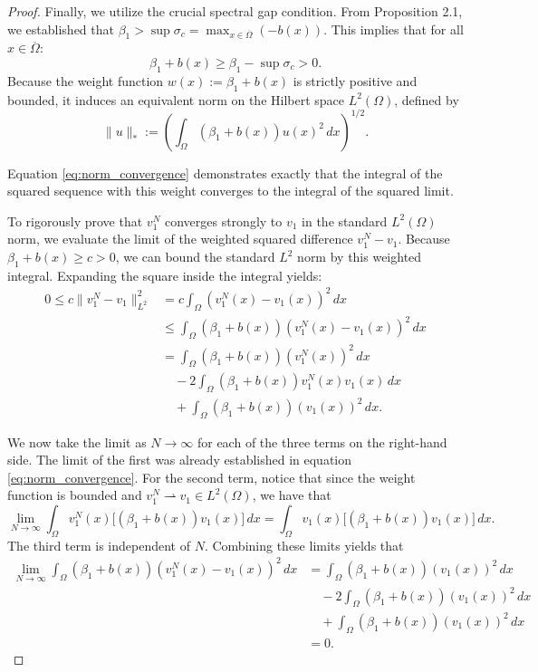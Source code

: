 \documentclass[12pt, a4paper]{article}
\theoremstyle{break}
\theoremstyle{break}
\theoremstyle{break}
\theoremstyle{break}
\theoremstyle{break}
\theoremstyle{break}
\theoremstyle{break}
\theoremstyle{break}
\theoremstyle{break}
\begin{document}
\begin{proof}
    Finally, we utilize the crucial spectral gap condition. From Proposition 2.1, we established that $\beta_1 > \sup \sigma_c = \max_{x \in \overline{\Omega}} (-b(x))$. This implies that for all $x \in \overline{\Omega}$:
    \begin{equation}
        \beta_1 + b(x) \geq \beta_1 - \sup \sigma_c > 0.
    \end{equation}
    Because the weight function $w(x) := \beta_1 + b(x)$ is strictly positive and bounded, it induces an equivalent norm on the Hilbert space $L^2(\Omega)$, defined by
    \begin{equation}
        \|u\|_{*} := \left( \int_\Omega (\beta_1 + b(x)) u(x)^2 \, dx \right)^{1/2}.
    \end{equation}
    
    Equation \eqref{eq:norm_convergence} demonstrates exactly that the integral of the squared sequence with this weight converges to the integral of the squared limit. 
    
    To rigorously prove that $v_1^N$ converges strongly to $v_1$ in the standard $L^2(\Omega)$ norm, we evaluate the limit of the weighted squared difference $v_1^N - v_1$. Because $\beta_1 + b(x) \geq c > 0$, we can bound the standard $L^2$ norm by this weighted integral. Expanding the square inside the integral yields:
    \begin{align}
        0 \leq c \|v_1^N - v_1\|_{L^2}^2 &= c \int_\Omega (v_1^N(x) - v_1(x))^2 \, dx \nonumber \\
        &\leq \int_\Omega (\beta_1 + b(x))(v_1^N(x) - v_1(x))^2 \, dx \nonumber \\
        &= \int_\Omega (\beta_1 + b(x))(v_1^N(x))^2 \, dx \nonumber \\
        &\quad - 2 \int_\Omega (\beta_1 + b(x))v_1^N(x)v_1(x) \, dx \nonumber \\
        &\quad + \int_\Omega (\beta_1 + b(x))(v_1(x))^2 \, dx.
    \end{align}
    
    We now take the limit as $N \to \infty$ for each of the three terms on the right-hand side. The limit of the first was already established in equation \eqref{eq:norm_convergence}. For the second term, notice that since the weight function is bounded  and $v_1^N \rightharpoonup v_1 \in L^2(\Omega)$, we have that
    \begin{equation}
        \lim_{N \to \infty} \int_\Omega v_1^N(x) \big[ (\beta_1 + b(x)) v_1(x) \big] \, dx = \int_\Omega v_1(x) \big[ (\beta_1 + b(x)) v_1(x) \big] \, dx.
    \end{equation}
    The third term is independent of $N$. Combining these limits yields that
    \begin{align}
        \lim_{N \to \infty} \int_\Omega (\beta_1 + b(x))(v_1^N(x) - v_1(x))^2 \, dx 
        &= \int_\Omega (\beta_1 + b(x))(v_1(x))^2 \, dx \nonumber \\
        &\quad - 2 \int_\Omega (\beta_1 + b(x))(v_1(x))^2 \, dx \nonumber \\
        &\quad + \int_\Omega (\beta_1 + b(x))(v_1(x))^2 \, dx \nonumber \\
        &= 0.
    \end{align}
    

\end{proof}
\end{document}
